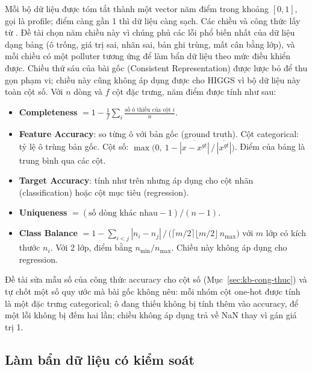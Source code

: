 Mỗi bộ dữ liệu được tóm tắt thành một vector năm điểm trong khoảng $[0,1]$, gọi là profile; điểm càng gần 1 thì dữ liệu càng sạch. Các chiều và công thức lấy từ \bbMohRef{}. Đề tài chọn năm chiều này vì chúng phủ các lỗi phổ biến nhất của dữ liệu dạng bảng (ô trống, giá trị sai, nhãn sai, bản ghi trùng, mất cân bằng lớp), và mỗi chiều có một polluter tương ứng để làm bẩn dữ liệu theo mức điều khiển được. Chiều thứ sáu của bài gốc (Consistent Representation) được lược bỏ để thu gọn phạm vi; chiều này cũng không áp dụng được cho HIGGS vì bộ dữ liệu này toàn cột số. Với $n$ dòng và $f$ cột đặc trưng, năm điểm được tính như sau:
\begin{itemize}
  \item \textbf{Completeness} $= 1 - \frac{1}{f}\sum_{i} \frac{\text{số ô thiếu của cột } i}{n}$.
  \item \textbf{Feature Accuracy}: so từng ô với bản gốc (ground truth). Cột categorical: tỷ lệ ô trùng bản gốc. Cột số: $\max\!\big(0,\ 1 - \overline{|x-x^{gt}|}\,/\,\overline{|x^{gt}|}\big)$. Điểm của bảng là trung bình qua các cột.
  \item \textbf{Target Accuracy}: tính như trên nhưng áp dụng cho cột nhãn (classification) hoặc cột mục tiêu (regression).
  \item \textbf{Uniqueness} $= (\text{số dòng khác nhau} - 1)/(n-1)$.
  \item \textbf{Class Balance} $= 1 - \sum_{i<j}|n_i-n_j| \,/\, \big(\lceil m/2\rceil \lfloor m/2\rfloor\, n_{\max}\big)$ với $m$ lớp có kích thước $n_i$. Với 2 lớp, điểm bằng $n_{\min}/n_{\max}$. Chiều này không áp dụng cho regression.
\end{itemize}
Đề tài sửa mẫu số của công thức accuracy cho cột số (Mục~\ref{sec:kb-cong-thuc}) và tự chốt một số quy ước mà bài gốc không nêu: mỗi nhóm cột one-hot được tính là một đặc trưng categorical; ô đang thiếu không bị tính thêm vào accuracy, để một lỗi không bị đếm hai lần; chiều không áp dụng trả về NaN thay vì gán giá trị 1.

\subsection{Làm bẩn dữ liệu có kiểm soát}
\label{sec:pollution}


